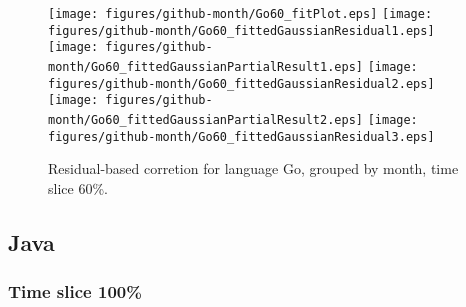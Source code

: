 \begin{figure}[hb]
\centering
{}
{\texttt{[image: figures/github-month/Go60\_fitPlot.eps]}}
{\texttt{[image: figures/github-month/Go60\_fittedGaussianResidual1.eps]}}
{\texttt{[image: figures/github-month/Go60\_fittedGaussianPartialResult1.eps]}}
{\texttt{[image: figures/github-month/Go60\_fittedGaussianResidual2.eps]}}
{\texttt{[image: figures/github-month/Go60\_fittedGaussianPartialResult2.eps]}}
{\texttt{[image: figures/github-month/Go60\_fittedGaussianResidual3.eps]}}
\caption{Residual-based corretion for language Go, grouped by month, time slice 60\%.}
\end{figure}


\clearpage 
\newpage 


\subsection{Java}

\FloatBarrier

\subsubsection{Time slice 100\%}

